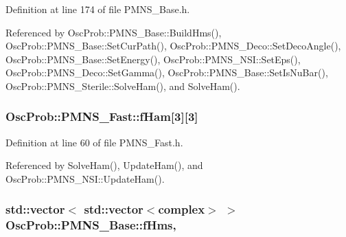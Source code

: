 Definition at line 174 of file P\+M\+N\+S\+\_\+\+Base.\+h.



Referenced by Osc\+Prob\+::\+P\+M\+N\+S\+\_\+\+Base\+::\+Build\+Hms(), Osc\+Prob\+::\+P\+M\+N\+S\+\_\+\+Base\+::\+Set\+Cur\+Path(), Osc\+Prob\+::\+P\+M\+N\+S\+\_\+\+Deco\+::\+Set\+Deco\+Angle(), Osc\+Prob\+::\+P\+M\+N\+S\+\_\+\+Base\+::\+Set\+Energy(), Osc\+Prob\+::\+P\+M\+N\+S\+\_\+\+N\+S\+I\+::\+Set\+Eps(), Osc\+Prob\+::\+P\+M\+N\+S\+\_\+\+Deco\+::\+Set\+Gamma(), Osc\+Prob\+::\+P\+M\+N\+S\+\_\+\+Base\+::\+Set\+Is\+Nu\+Bar(), Osc\+Prob\+::\+P\+M\+N\+S\+\_\+\+Sterile\+::\+Solve\+Ham(), and Solve\+Ham().

\subsubsection[{\texorpdfstring{f\+Ham}{fHam}}]{ Osc\+Prob\+::\+P\+M\+N\+S\+\_\+\+Fast\+::f\+Ham\mbox{[}3\mbox{]}\mbox{[}3\mbox{]}\hspace{0.3cm}{\ttfamily [protected]}}\hypertarget{classOscProb_1_1PMNS__Fast_aab37f2a7f59ab7026a8a21a561115dd0}{}\label{classOscProb_1_1PMNS__Fast_aab37f2a7f59ab7026a8a21a561115dd0}


Definition at line 60 of file P\+M\+N\+S\+\_\+\+Fast.\+h.



Referenced by Solve\+Ham(), Update\+Ham(), and Osc\+Prob\+::\+P\+M\+N\+S\+\_\+\+N\+S\+I\+::\+Update\+Ham().

\subsubsection[{\texorpdfstring{f\+Hms}{fHms}}]{\setlength{\rightskip}{0pt plus 5cm}std\+::vector$<$ std\+::vector$<${\bf complex}$>$ $>$ Osc\+Prob\+::\+P\+M\+N\+S\+\_\+\+Base\+::f\+Hms\hspace{0.3cm}{\ttfamily [protected]}, {\ttfamily [inherited]}}\hypertarget{classOscProb_1_1PMNS__Base_adf5901166216e8c7a5cff2092952f473}{}\label{classOscProb_1_1PMNS__Base_adf5901166216e8c7a5cff2092952f473}


